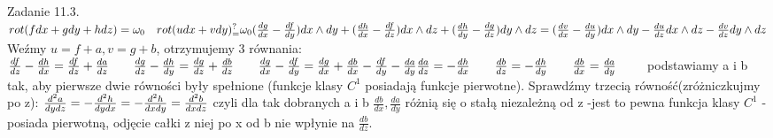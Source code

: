 \documentclass{article}
\begin{document}
Zadanie 11.3.
\newline
\newline
$
rot(fdx+gdy+hdz)=\omega_0\quad rot(udx+vdy)_=^? \omega_0\newline
(\frac{dg}{dx}-\frac{df}{dy})dx\wedge dy+(\frac{dh}{dx}-\frac{df}{dz})dx\wedge dz+(\frac{dh}{dy}-\frac{dg}{dz})dy\wedge dz=
(\frac{dv}{dx}-\frac{du}{dy})dx\wedge dy-\frac{du}{dz}dx\wedge dz-\frac{dv}{dz}dy\wedge dz\newline
$
Weźmy $u=f+a,v=g+b$, otrzymujemy 3 równania:\newline
$
\frac{df}{dz}-\frac{dh}{dx}=\frac{df}{dz}+\frac{da}{dz}\quad\quad \frac{dg}{dz}-\frac{dh}{dy}=\frac{dg}{dz}+\frac{db}{dz}\quad\quad
\frac{dg}{dx}-\frac{df}{dy}=\frac{dg}{dx}+\frac{db}{dx}-\frac{df}{dy}-\frac{da}{dy}\newline
\frac{da}{dz}=-\frac{dh}{dx}\quad\quad \frac{db}{dz}=-\frac{dh}{dy}\quad\quad \frac{db}{dx}=\frac{da}{dy}\quad\quad
$
podstawiamy a i b tak, aby pierwsze dwie równości były spełnione (funkcje klasy $C^1$ posiadają funkcje pierwotne). Sprawdźmy trzecią równość(zróżniczkujmy po z):
$\newline
\frac{d^2a}{dydz}=-\frac{d^2h}{dydx}=-\frac{d^2h}{dxdy}=\frac{d^2b}{dxdz}\newline
$
czyli dla tak dobranych a i b $\frac{db}{dx},\frac{da}{dy}$ różnią się o stałą niezależną od z -jest to pewna funkcja klasy $C^1$ - posiada pierwotną, odjęcie
całki z niej po x od b nie wpłynie na $\frac{db}{dz}$.
\end{document}
